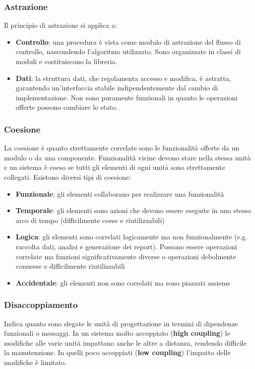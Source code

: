 \subsubsection{Astrazione}
Il principio di astrazione si applica a:
\begin{itemize}
	\item \textbf{Controllo}: una procedura è vista come modulo di astrazione del flusso di controllo, nascondendo l'algoritmo utilizzato. Sono organizzate in classi di moduli e costituiscono la libreria.
	\item \textbf{Dati}: la struttura dati, che regolamenta accesso e modifica, è astratta, garantendo un'interfaccia stabile indipendentemente dal cambio di implementazione. Non sono puramente funzionali in quanto le operazioni offerte possono cambiare lo stato.
\end{itemize}

\subsubsection{Coesione}
La coesione è quanto strettamente correlate sono le funzionalità offerte da un modulo o da una componente. Funzionalità vicine devono stare nella stessa unità e un sistema è coeso se tutti gli elementi di ogni unità sono strettamente collegati. Esistono diversi tipi di coesione:
\begin{itemize}
	\item \textbf{Funzionale}: gli elementi collaborano per realizzare una funzionalità
	\item \textbf{Temporale}: gli elementi sono azioni che devono essere eseguite in uno stesso arco di tempo (difficilmente coese e riutilizzabili)
	\item \textbf{Logica}: gli elementi sono correlati logicamente ma non funzionalmente (e.g. raccolta dati, analisi e generazione dei report). Possono essere operazioni correlate ma funzioni significativamente diverse o operazioni debolmente connesse e difficilmente riutilizzabili
	\item \textbf{Accidentale}: gli elementi non sono correlati ma sono piazzati assieme
\end{itemize}

\subsubsection{Disaccoppiamento}
Indica quanto sono slegate le unità di progettazione in termini di dipendenze funzionali o messaggi. In un sistema molto accoppiato (\textbf{high coupling}) le modifiche alle varie unità impattano anche le altre a distanza, rendendo difficile la manutenzione. In quelli poco accoppiati (\textbf{low coupling}) l'impatto delle modifiche è limitato.

